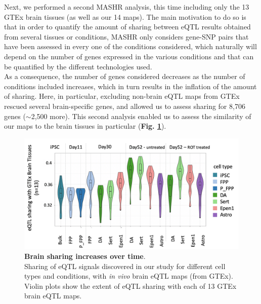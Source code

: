 \newpage

Next, we performed a second MASHR analysis, this time including only the 13 GTEx brain tissues (as well as our 14 maps).
The main motivation to do so is that in order to quantify the amount of sharing between eQTL results obtained from several tissues or conditions, MASHR only considers gene-SNP pairs that have been assessed in every one of the conditions considered, which naturally will depend on the number of genes expressed in the various conditions and that can be quantified by the different technologies used. 
\\

As a consequence, the number of genes considered decreases as the number of conditions included increases, which in turn results in the inflation of the amount of sharing.
Here, in particular, excluding non-brain eQTL maps from GTEx rescued several brain-specific genes, and allowed us to assess sharing for 8,706 genes ($\sim$2,500 more).
This second analysis enabled us to assess the similarity of our maps to the brain tissues in particular (\textbf{Fig. \ref{fig:neuroseq_and_gtex_brain_sharing}}). \\

\begin{figure}[h]
\centering
\includegraphics[width=16cm]{Chapter5/Fig/neuroseq_gtex_brain_boxplots.png}
\caption[Brain sharing increase]{\textbf{Brain sharing increases over time}.\\
Sharing of eQTL signals discovered in our study for different cell types and conditions, 
with \textit{in vivo} brain eQTL maps (from GTEx). 
Violin plots show the extent of eQTL sharing with each of 13 GTEx brain eQTL maps.
}
\label{fig:neuroseq_and_gtex_brain_sharing}
\end{figure}

